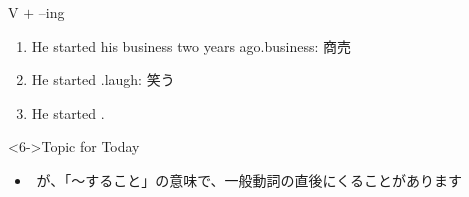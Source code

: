 \documentclass[aspectratio=169,xcolor={dvipsnames,table}]{beamer}
\begin{document}
\begin{frame}[plain]{V $+$ --ing}
 \begin{enumerate}
  \item<1-> He started his business two years ago.\hfill{\scriptsize business: 商売}
  \item<2-> He started .\hfill{\scriptsize laugh: 笑う}
  \item<4-> He started .
 \end{enumerate}

\begin{exampleblock}<6->{Topic for Today}
\begin{itemize}\small
 \item {}\,\,が、「〜すること」の意味で、一般動詞の直後にくることがあります
 \end{itemize}
     \end{exampleblock}
\end{frame}
\end{document}

